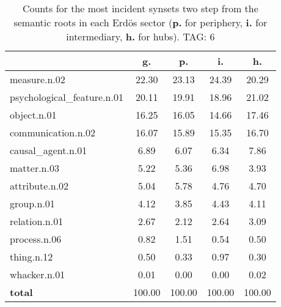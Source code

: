 \begin{table}[h!]
\begin{center}
\begin{tabular}{| l | c | c | c | c |}\hline
 & g. & p. & i. & h. \\\hline
measure.n.02 & 22.30  & 23.13  & 24.39  & 20.29 \\\hline
psychological\_feature.n.01 & 20.11  & 19.91  & 18.96  & 21.02 \\\hline
object.n.01 & 16.25  & 16.05  & 14.66  & 17.46 \\\hline
communication.n.02 & 16.07  & 15.89  & 15.35  & 16.70 \\\hline
causal\_agent.n.01 & 6.89  & 6.07  & 6.34  & 7.86 \\\hline
matter.n.03 & 5.22  & 5.36  & 6.98  & 3.93 \\\hline
attribute.n.02 & 5.04  & 5.78  & 4.76  & 4.70 \\\hline
group.n.01 & 4.12  & 3.85  & 4.43  & 4.11 \\\hline
relation.n.01 & 2.67  & 2.12  & 2.64  & 3.09 \\\hline
process.n.06 & 0.82  & 1.51  & 0.54  & 0.50 \\\hline
thing.n.12 & 0.50  & 0.33  & 0.97  & 0.30 \\\hline
whacker.n.01 & 0.01  & 0.00  & 0.00  & 0.02 \\\hline
{{\bf total}} & 100.00  & 100.00  & 100.00  & 100.00 \\\hline
\end{tabular}
\caption{Counts for the most incident synsets two step from the semantic roots in each Erd\"os sector ({\bf p.} for periphery, {\bf i.} for intermediary, {\bf h.} for hubs). TAG: 6}
\end{center}
\end{table}